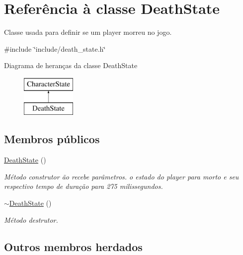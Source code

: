 \hypertarget{classDeathState}{}\section{Referência à classe Death\+State}
\label{classDeathState}


Classe usada para definir se um player morreu no jogo.  




{\ttfamily \#include \char`\"{}include/death\+\_\+state.\+h\char`\"{}}

Diagrama de heranças da classe Death\+State\begin{figure}[H]
\begin{center}
\leavevmode
\includegraphics[height=2.000000cm]{classDeathState}
\end{center}
\end{figure}
\subsection*{Membros públicos}
\begin{DoxyCompactItemize}
\item 
\mbox{\label{classDeathState_a7aca912131fc319ab8fa9177a022d329}} 
\mbox{\hyperlink{classDeathState_a7aca912131fc319ab8fa9177a022d329}{Death\+State}} ()
\begin{DoxyCompactList}\small\item\em Método construtor ão recebe parâmetros.  o estado do player para morto e seu respectivo tempo de duração para 275 milissegundos. \end{DoxyCompactList}\item 
\mbox{\label{classDeathState_a6121eebafce7f33371eb73986b6e6250}} 
\mbox{\hyperlink{classDeathState_a6121eebafce7f33371eb73986b6e6250}{$\sim$\+Death\+State}} ()
\begin{DoxyCompactList}\small\item\em Método destrutor. \end{DoxyCompactList}\end{DoxyCompactItemize}
\subsection*{Outros membros herdados}


